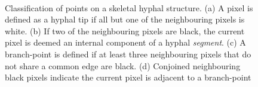 \begin{figure}[tb]
	\centering
	\hspace{1cm}
	\\
	\hspace{1cm}
  \caption{Classification of points on a skeletal hyphal structure. (a) A pixel is defined as a hyphal tip if all but one of the neighbouring pixels is white. (b) If two of the neighbouring pixels are black, the current pixel is deemed an internal component of a hyphal \emph{segment}. (c) A branch-point is defined if at least three neighbouring pixels that do not share a common edge are black. (d) Conjoined neighbouring black pixels indicate the current pixel is adjacent to a branch-point}
  \label{fig:ClassPoints}
\end{figure}

